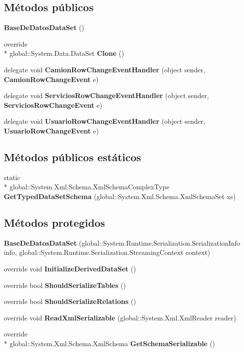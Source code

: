 \subsection*{Métodos públicos}
\begin{DoxyCompactItemize}
\item 
{\bf Base\-De\-Datos\-Data\-Set} ()
\item 
override \\*
global\-::\-System.\-Data.\-Data\-Set {\bf Clone} ()
\item 
delegate void {\bf Camion\-Row\-Change\-Event\-Handler} (object sender, {\bf Camion\-Row\-Change\-Event} e)
\item 
delegate void {\bf Servicios\-Row\-Change\-Event\-Handler} (object sender, {\bf Servicios\-Row\-Change\-Event} e)
\item 
delegate void {\bf Usuario\-Row\-Change\-Event\-Handler} (object sender, {\bf Usuario\-Row\-Change\-Event} e)
\end{DoxyCompactItemize}
\subsection*{Métodos públicos estáticos}
\begin{DoxyCompactItemize}
\item 
static \\*
global\-::\-System.\-Xml.\-Schema.\-Xml\-Schema\-Complex\-Type {\bf Get\-Typed\-Data\-Set\-Schema} (global\-::\-System.\-Xml.\-Schema.\-Xml\-Schema\-Set xs)
\end{DoxyCompactItemize}
\subsection*{Métodos protegidos}
\begin{DoxyCompactItemize}
\item 
{\bf Base\-De\-Datos\-Data\-Set} (global\-::\-System.\-Runtime.\-Serialization.\-Serialization\-Info info, global\-::\-System.\-Runtime.\-Serialization.\-Streaming\-Context context)
\item 
override void {\bf Initialize\-Derived\-Data\-Set} ()
\item 
override bool {\bf Should\-Serialize\-Tables} ()
\item 
override bool {\bf Should\-Serialize\-Relations} ()
\item 
override void {\bf Read\-Xml\-Serializable} (global\-::\-System.\-Xml.\-Xml\-Reader reader)
\item 
override \\*
global\-::\-System.\-Xml.\-Schema.\-Xml\-Schema {\bf Get\-Schema\-Serializable} ()
\end{DoxyCompactItemize}
